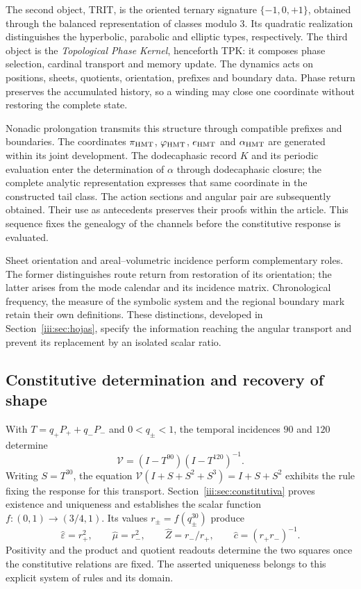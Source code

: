 The second object, TRIT, is the oriented ternary signature
$\{-1,0,+1\}$, obtained through the balanced representation of
classes modulo $3$. Its quadratic realization distinguishes the
hyperbolic, parabolic and elliptic types, respectively. The third
object is the \emph{Topological Phase Kernel}, henceforth TPK:
it composes phase selection, cardinal transport and memory update.
The dynamics acts on positions, sheets, quotients, orientation,
prefixes and boundary data. Phase return preserves the accumulated
history, so a winding may close one coordinate without restoring
the complete state.

Nonadic prolongation transmits this structure through compatible
prefixes and boundaries. The coordinates $\pi_{\rm HMT}$,
$\varphi_{\rm HMT}$, $e_{\rm HMT}$ and $\alpha_{\rm HMT}$ are
generated within its joint development. The dodecaphasic record $K$
and its periodic evaluation enter the determination of $\alpha$ through dodecaphasic closure;
the complete analytic representation expresses that same coordinate
in the constructed tail class. The action sections and angular pair
are subsequently obtained. Their use as antecedents preserves their
proofs within the article. This sequence fixes the genealogy of the
channels before the constitutive response is evaluated.

Sheet orientation and areal--volumetric incidence perform complementary
roles. The former distinguishes route return from restoration of its
orientation; the latter arises from the mode calendar and its
incidence matrix. Chronological frequency, the measure of the symbolic
system and the regional boundary mark retain their own definitions.
These distinctions, developed in Section~\ref{iii:sec:hojas}, specify
the information reaching the angular transport and prevent its
replacement by an isolated scalar ratio.

\clearpage
\subsection{Constitutive determination and recovery of shape}

With $T=q_+P_++q_-P_-$ and $0<q_\pm<1$, the temporal incidences
$90$ and $120$ determine
\[
\mathcal V=(I-T^{90})(I-T^{120})^{-1}.
\]
Writing $S=T^{30}$, the equation
$\mathcal V(I+S+S^2+S^3)=I+S+S^2$ exhibits the rule fixing the
response for this transport. Section~\ref{iii:sec:constitutiva}
proves existence and uniqueness and establishes the scalar function
$f:(0,1)\to(3/4,1)$. Its values $r_\pm=f(q_\pm^{30})$ produce
\[
\widehat\varepsilon=r_+^2,\qquad
\widehat\mu=r_-^2,\qquad
\widehat Z=r_-/r_+,\qquad
\widehat c=(r_+r_-)^{-1}.
\]
Positivity and the product and quotient readouts determine the two
squares once the constitutive relations are fixed. The asserted
uniqueness belongs to this explicit system of rules and its domain.

